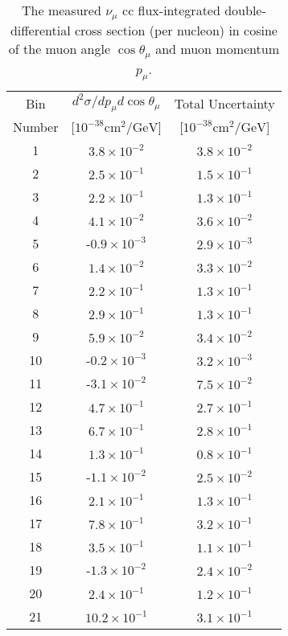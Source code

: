 \begin{table}[]
\caption[$\nu_\mu$ \acrshort{cc} Double-Differential Cross Section in Muon Momentum and Angle]{The measured $\nu_\mu$ \acrshort{cc} flux-integrated double-differential cross section (per nucleon) in cosine of the muon angle $\cos\theta_\mu$ and muon momentum $p_\mu$.}
\label{tab:xsec_meangle_mumom}
\centering
\begin{tabular}{ccc}
\toprule
Bin  & ${d^2\sigma}/{dp_\mu d\cos\theta_\mu}$ & Total Uncertainty\\
Number & [$10^{-38} \text{cm}^2/\text{GeV}$] & [$10^{-38} \text{cm}^2/\text{GeV}$]\\
\midrule
1 &  $3.8\times 10^{-2}$  &  $3.8\times 10^{-2}$ \\
2 &  $2.5\times 10^{-1}$  &  $1.5\times 10^{-1}$ \\
3 &  $2.2\times 10^{-1}$  &  $1.3\times 10^{-1}$ \\
4 &  $4.1\times 10^{-2}$  &  $3.6\times 10^{-2}$ \\
5 &  -$0.9\times 10^{-3}$  &  $2.9\times 10^{-3}$ \\
6 & $1.4\times 10^{-2}$  &  $3.3\times 10^{-2}$ \\
7 & $2.2\times 10^{-1}$  &  $1.3\times 10^{-1}$ \\
8 & $2.9\times 10^{-1}$  &  $1.3\times 10^{-1}$ \\
9 & $5.9\times 10^{-2}$  &  $3.4\times 10^{-2}$ \\
10 & -$0.2\times 10^{-3}$  &  $3.2\times 10^{-3}$ \\
11 & -$3.1\times 10^{-2}$  &  $7.5\times 10^{-2}$ \\
12 & $4.7\times 10^{-1}$  &  $2.7\times 10^{-1}$ \\
13 & $6.7\times 10^{-1}$  &  $2.8\times 10^{-1}$ \\
14 & $1.3\times 10^{-1}$  &  $0.8\times 10^{-1}$ \\
15 & -$1.1\times 10^{-2}$  &  $2.5\times 10^{-2}$ \\
16 & $2.1\times 10^{-1}$  &  $1.3\times 10^{-1}$ \\
17 & $7.8\times 10^{-1}$  &  $3.2\times 10^{-1}$ \\
18 & $3.5\times 10^{-1}$  &  $1.1\times 10^{-1}$ \\
19 & -$1.3\times 10^{-2}$  &  $2.4\times 10^{-2}$ \\
20 & $2.4\times 10^{-1}$  &  $1.2\times 10^{-1}$ \\
21 & $10.2\times 10^{-1}$  &  $3.1\times 10^{-1}$ \\

\end{tabular}
\end{table}
